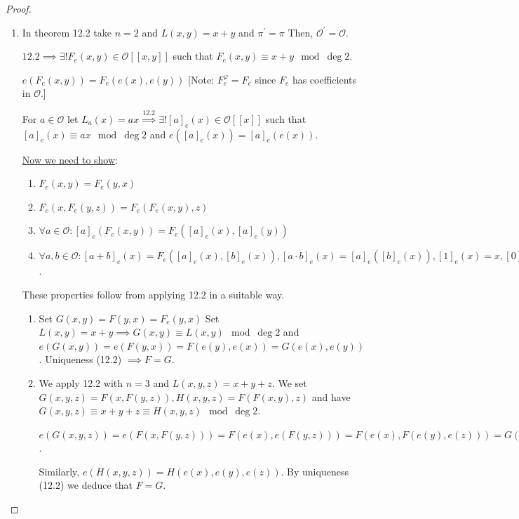 \documentclass[openany]{amsbook}
\numberwithin{section}{chapter}
\theoremstyle{definition}
\begin{document}
\begin{proof}
    \begin{enumerate}[label=\roman*)]
        \item In theorem 12.2 take \(n=2\) and \(L(x,y) = x+y\) and \(\pi^{\prime} = \pi\) Then, \(\mathcal{O} ^{\prime} = \mathcal{O}\).
        
        \(12.2 \implies \exists ! F_e(x,y) \in \mathcal{O} [[x,y]]\) such that \(F_e(x,y) \equiv x+y \mod\deg 2\).

        \(e(F_e(x,y))=F_e(e(x),e(y))\) [Note: \(F_e^{\varphi} = F_e\) since \(F_e\) has coefficients in \(\mathcal{O}\).]

        For \(a\in \mathcal{O}\) let \(L_a(x) = ax \overset{12.2}{\implies} \exists ! [a]_e(x) \in \mathcal{O}[[x]]\) such that \([a]_e(x) \equiv ax \mod\deg 2\) and \(e([a]_e(x))=[a]_e(e(x))\).

        \underline{Now we need to show}:

        \begin{enumerate}[label=\arabic*)]
            \item \(F_e(x,y)=F_e(y,x)\) 
            \item \(F_e(x,F_e(y,z))=F_e(F_e(x,y),z)\) 
            \item \(\forall a\in \mathcal{O} : [a]_e(F_e(x,y))=F_e([a]_e(x),[a]_e(y))\) 
            \item \(\forall a,b\in \mathcal{O}: [a+b]_e(x) = F_e([a]_e(x),[b]_e(x)),[a\cdot b]_e(x) = [a]_e([b]_e(x)),[1]_e(x)=x,[0]_e(x)=0\). 
        \end{enumerate} 

        These properties follow from applying 12.2 in a suitable way.

        \begin{enumerate}[label=\arabic*)]
            \item Set \(G(x,y)=F(y,x)=F_e(y,x)\) Set \(L(x,y) = x+y \implies G(x,y)\equiv L(x,y)\mod\deg 2\) and \(e(G(x,y))=e(F(y,x))=F(e(y),e(x))=G(e(x),e(y))\). Uniqueness (12.2) \(\implies F=G\).
            \item We apply 12.2 with \(n=3\) and \(L(x,y,z) = x+y+z\). We set \(G(x,y,z)=F(x,F(y,z)),H(x,y,z)=F(F(x,y),z)\) and have \(G(x,y,z) \equiv x+y+z \equiv H(x,y,z)\mod\deg 2\).
            
            \(e(G(x,y,z))= e(F(x,F(y,z))) = F(e(x),e(F(y,z)))=F(e(x),F(e(y),e(z)))=G(e(x),e(y),e(z))\).

            Similarly, \(e(H(x,y,z))=H(e(x),e(y),e(z))\). By uniqueness (12.2) we deduce that \(F=G\).


\end{enumerate}
\end{enumerate}
\end{proof}
\end{document}
